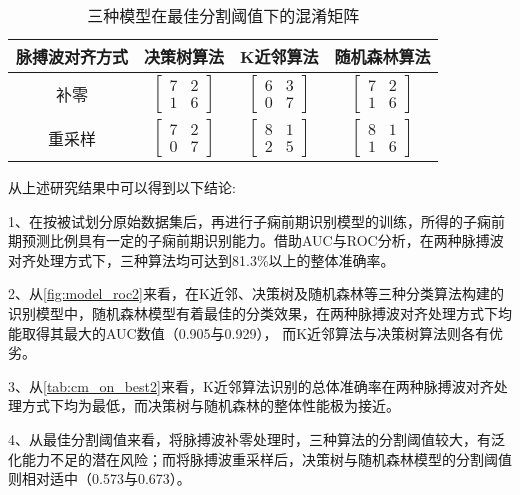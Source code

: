 \begin{table}[htbp]
      \centering
      \caption{\label{tab:cm_on_best2}三种模型在最佳分割阈值下的混淆矩阵}
      \begin{tabular}{cccc}
      \toprule
      \textbf{脉搏波对齐方式}&\textbf{决策树算法}&\textbf{K近邻算法}&\textbf{随机森林算法}\\
      \midrule
      补零&$\left[ \begin{array}{cc} 7 & 2 \\ 1 & 6 \end{array} \right]$ & $\left[ \begin{array}{cc} 6 & 3 \\ 0 & 7 \end{array} \right]$ & $\left[ \begin{array}{cc} 7 & 2 \\ 1 & 6 \end{array} \right]$ \\
      重采样&$\left[ \begin{array}{cc} 7 & 2 \\ 0 & 7 \end{array} \right]$ & $\left[ \begin{array}{cc} 8 & 1 \\ 2 & 5 \end{array} \right]$ & $\left[ \begin{array}{cc} 8 & 1 \\ 1 & 6 \end{array} \right]$ \\
      \bottomrule
      \end{tabular}%
\end{table}%

从上述研究结果中可以得到以下结论:

1、在按被试划分原始数据集后，再进行子痫前期识别模型的训练，所得的子痫前期预测比例具有一定的子痫前期识别能力。借助AUC与ROC分析，在两种脉搏波对齐处理方式下，三种算法均可达到81.3\%以上的整体准确率。

2、从\autoref{fig:model_roc2}来看，在K近邻、决策树及随机森林等三种分类算法构建的识别模型中，随机森林模型有着最佳的分类效果，在两种脉搏波对齐处理方式下均能取得其最大的AUC数值（0.905与0.929），
而K近邻算法与决策树算法则各有优劣。

3、从\autoref{tab:cm_on_best2}来看，K近邻算法识别的总体准确率在两种脉搏波对齐处理方式下均为最低，而决策树与随机森林的整体性能极为接近。

4、从最佳分割阈值来看，将脉搏波补零处理时，三种算法的分割阈值较大，有泛化能力不足的潜在风险；而将脉搏波重采样后，决策树与随机森林模型的分割阈值则相对适中（0.573与0.673）。

